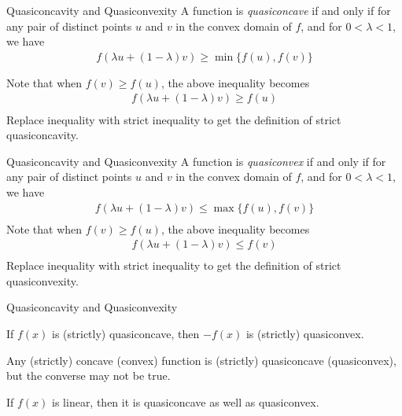 \documentclass{./../../Latex/teaching_slides}
\begin{document}
\begin{frame}{Quasiconcavity and Quasiconvexity}
A function is \textit{quasiconcave} if and only if for any pair of distinct points $u$ and $v$ in the convex domain of $f$, and for $0<\lambda<1$, we have
$$
\begin{array}{r}
f(\lambda u+(1-\lambda) v) \geq \min \{f(u), f(v)\} \\~\\
\end{array}
$$
Note that when $f(v) \geq f(u)$, the above inequality becomes 
$$
\begin{array}{r}
f(\lambda u+(1-\lambda) v) \geq f(u) \\
\end{array}
$$
Replace inequality with strict inequality to get the definition of strict quasiconcavity.
\end{frame}

\begin{frame}{Quasiconcavity and Quasiconvexity}
A function is \textit{quasiconvex} if and only if for any pair of distinct points $u$ and $v$ in the convex domain of $f$, and for $0<\lambda<1$, we have
$$
\begin{array}{r}
f(\lambda u+(1-\lambda) v) \leq \max \{f(u), f(v)\} \\
\end{array}
$$
Note that when $f(v) \geq f(u)$, the above inequality becomes 
$$
\begin{array}{r}
f(\lambda u+(1-\lambda) v) \leq f(v) \\
\end{array}
$$
Replace inequality with strict inequality to get the definition of strict quasiconvexity. 
\end{frame}



\begin{frame}{Quasiconcavity and Quasiconvexity}
\begin{witemize}
  \item If $f(x)$ is (strictly) quasiconcave, then $-f(x)$ is (strictly) quasiconvex.
\item Any (strictly) concave (convex) function is (strictly) quasiconcave (quasiconvex), but the converse may not be true.
\item If $f(x)$ is linear, then it is quasiconcave as well as quasiconvex.
\end{witemize}
\end{frame}
\end{document}
